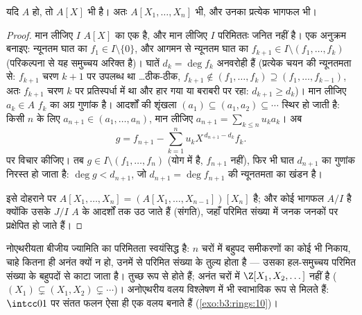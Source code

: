 \begin{theorem}[हिल्बर्ट की आधार प्रमेय]\label{thm:b3:rings:hilbert}
यदि $A$  हो, तो $A[X]$ भी  है। अतः $A[X_1, \dots,
X_n]$ भी, और
उनका प्रत्येक भागफल भी।
\end{theorem}

\begin{proof}
मान लीजिए $I$ $A[X]$ का एक  है, और मान लीजिए $I$
परिमिततः जनित नहीं है। एक अनुक्रम बनाइए: न्यूनतम घात का $f_1 \in I \setminus \{0\}$,
और आगमन से न्यूनतम घात का $f_{k+1} \in I \setminus (f_1,
\dots, f_k)$ (परिकल्पना से यह समुच्चय अरिक्त
है)। घातें $d_k = \deg f_k$ अनवरोही हैं (प्रत्येक चयन की न्यूनतमता से:
$f_{k+1}$ चरण $k+1$ पर उपलब्ध था \dots ठीक-ठीक, $f_{k+1} \notin (f_1,\dots,f_k) \supseteq
(f_1, \dots, f_{k-1})$, अतः $f_{k+1}$
चरण $k$ पर प्रतिस्पर्धा में था और हार गया या बराबरी पर रहा:
$d_{k+1} \geq d_k$)। मान लीजिए $a_k \in A$ $f_k$ का अग्र गुणांक है। आदर्शों की
शृंखला $(a_1) \subseteq (a_1,
a_2) \subseteq \cdots$ स्थिर हो जाती है: किसी $n$ के लिए $a_{n+1} \in (a_1, \dots,
a_n)$, मान
लीजिए $a_{n+1} = \sum_{k\leq n} u_k a_k$। अब
\[
g = f_{n+1} - \sum_{k=1}^{n} u_k X^{\,d_{n+1} - d_k} f_k .
\]
पर विचार कीजिए। तब $g \in I \setminus (f_1, \dots, f_n)$ (योग  में है, $f_{n+1}$ नहीं), फिर भी
घात $d_{n+1}$ का गुणांक निरस्त हो जाता है: $\deg g < d_{n+1}$, जो $d_{n+1} = \deg f_{n+1}$ की
न्यूनतमता का खंडन है।

इसे दोहराने पर $A[X_1, \dots, X_n] = (A[X_1, \dots, X_{n-1}])[X_n]$  है; और कोई भागफल $A/I$  है
क्योंकि उसके  $J/I$ $A$ के आदर्शों तक उठ जाते हैं
(संगति), जहाँ परिमित संख्या में जनक जनकों पर प्रक्षेपित हो जाते
हैं।
\end{proof}

\begin{remark}\label{rem:b3:rings:noethmeaning}
नोएथरीयता बीजीय ज्यामिति का परिमितता स्वयंसिद्ध है: $n$ चरों
में बहुपद समीकरणों का कोई भी निकाय, चाहे कितना ही अनंत क्यों न
हो, उनमें से परिमित संख्या के तुल्य होता है --- उसका हल-समुच्चय
परिमित संख्या के बहुपदों से काटा जाता है।  तुच्छ रूप से
 होते हैं; अनंत चरों में $\Z[X_1, X_2, \dots]$  नहीं है ($(X_1) \subsetneq (X_1, X_2) \subsetneq \cdots$)।
अनोएथरीय वलय विश्लेषण में भी स्वाभाविक रूप से मिलते हैं: $\intcc01$
पर संतत फलन ऐसा ही एक वलय बनाते हैं (\cref{exo:b3:rings:10})।
\end{remark}


